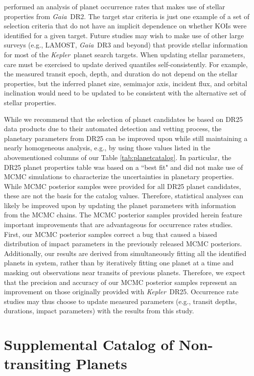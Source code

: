 \documentclass{aastex62}
\newcommand{\ik}{{\it Kepler~}}
\newcommand{\gaia}{{\it Gaia~}}
\begin{document}
\cite{Hsu:2019}
performed an analysis of planet occurrence rates that makes
use of stellar properties from \gaia DR2.  The \cite{Hsu:2019}
target star criteria is just one example of a set of selection criteria
that do not have an implicit dependence on whether KOIs were
identified for a given target.  Future studies may wish to make use of
other large surveys (e.g., LAMOST, \gaia DR3 and beyond) that provide stellar information
for most of the \ik planet search targets.  When updating stellar
parameters, care must be exercised to update derived quantiles
self-consistently.  For example, the measured transit epoch, depth,
and duration do not depend on the stellar properties, but the inferred
planet size, semimajor axis, incident flux, and orbital inclination
would need to be updated to be consistent with the alternative set of
stellar properties.

While we recommend that the selection of planet candidates be based on
DR25 data products due to their automated detection and vetting process,
the planetary parameters from DR25 can be improved upon while
still maintaining a nearly homogeneous analysis, e.g., by using those values listed in the abovementioned columns of our Table \ref{tab:planetcatalog}.  In particular, the
DR25 planet properties table was based on a ``best fit" and did not
make use of MCMC simulations to characterize the uncertainties in
planetary properties.  While MCMC posterior samples were provided for
all DR25 planet candidates, these are not the basis for the catalog
values.  Therefore, statistical analyses can likely be improved upon
by updating the planet parameters with information from the MCMC
chains.   The MCMC posterior samples provided herein feature
important improvements that are advantageous for occurrence rates
studies.  First, our MCMC posterior samples correct a
bug that caused a biased distribution of impact parameters in the
previously released MCMC posteriors.  Additionally, our
results are derived from simultaneously fitting all the identified
planets in system, rather than by iteratively fitting one planet at a
time and masking out observations near transits of previous planets.
Therefore, we expect that the precision and accuracy of our MCMC
posterior samples represent an improvement on those originally
provided with \ik DR25.  Occurrence rate studies may thus
choose to update measured parameters (e.g., transit depths, durations,
impact parameters) with the results from this study.


\section{Supplemental Catalog of Non-transiting Planets}\label{sec:App_nontransiting}
\end{document}
